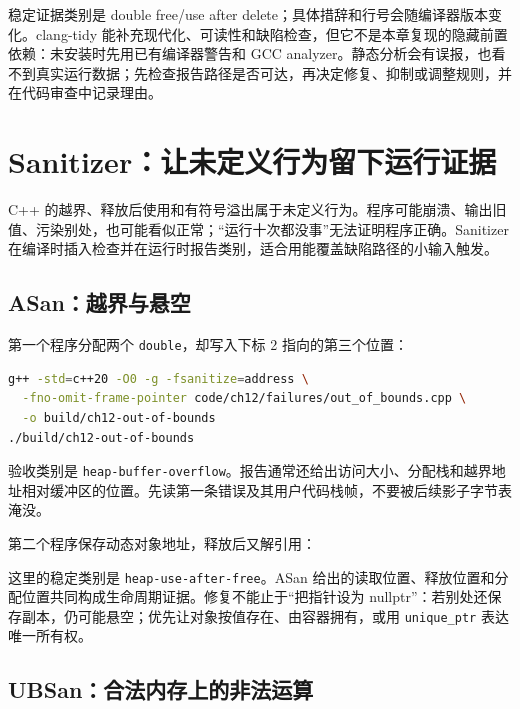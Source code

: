 稳定证据类别是 double free/use after delete；具体措辞和行号会随编译器版本变化。clang-tidy 能补充现代化、可读性和缺陷检查，但它不是本章复现的隐藏前置依赖：未安装时先用已有编译器警告和 GCC analyzer。静态分析会有误报，也看不到真实运行数据；先检查报告路径是否可达，再决定修复、抑制或调整规则，并在代码审查中记录理由。

\section{Sanitizer：让未定义行为留下运行证据}

C++ 的越界、释放后使用和有符号溢出属于未定义行为。程序可能崩溃、输出旧值、污染别处，也可能看似正常；“运行十次都没事”无法证明程序正确。Sanitizer 在编译时插入检查并在运行时报告类别，适合用能覆盖缺陷路径的小输入触发。

\subsection{ASan：越界与悬空}

第一个程序分配两个 \texttt{double}，却写入下标 2 指向的第三个位置：



\begin{lstlisting}[language=bash,numbers=none]
g++ -std=c++20 -O0 -g -fsanitize=address \
  -fno-omit-frame-pointer code/ch12/failures/out_of_bounds.cpp \
  -o build/ch12-out-of-bounds
./build/ch12-out-of-bounds
\end{lstlisting}

验收类别是 \texttt{heap-buffer-overflow}。报告通常还给出访问大小、分配栈和越界地址相对缓冲区的位置。先读第一条错误及其用户代码栈帧，不要被后续影子字节表淹没。

第二个程序保存动态对象地址，释放后又解引用：



这里的稳定类别是 \texttt{heap-use-after-free}。ASan 给出的读取位置、释放位置和分配位置共同构成生命周期证据。修复不能止于“把指针设为 nullptr”：若别处还保存副本，仍可能悬空；优先让对象按值存在、由容器拥有，或用 \texttt{unique\_ptr} 表达唯一所有权。

\subsection{UBSan：合法内存上的非法运算}

